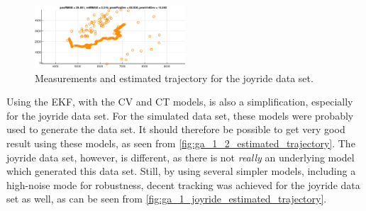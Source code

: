 \begin{figure}[ht]
    \centering
    \includegraphics[width=0.5\textwidth]{figures/ga_1/joyride_measurements_and_estimated_trajectory} 
    \caption{Measurements and estimated trajectory for the joyride data set. }
    \label{fig:ga_1_joyride_measurements_and_estimated_trajectory}
\end{figure}


Using the EKF, with the CV and CT models, is also a simplification, especially for the joyride data set. For the simulated data set, these models were probably used to generate the data set. It should therefore be possible to get very good result using these models, as seen from \cref{fig:ga_1_2_estimated_trajectory}. The joyride data set, however, is different, as there is not \textit{really} an underlying model which generated this data set. Still, by using several simpler models, including a high-noise mode for robustness, decent tracking was achieved for the joyride data set as well, as can be seen from \cref{fig:ga_1_joyride_estimated_trajectory}. 






